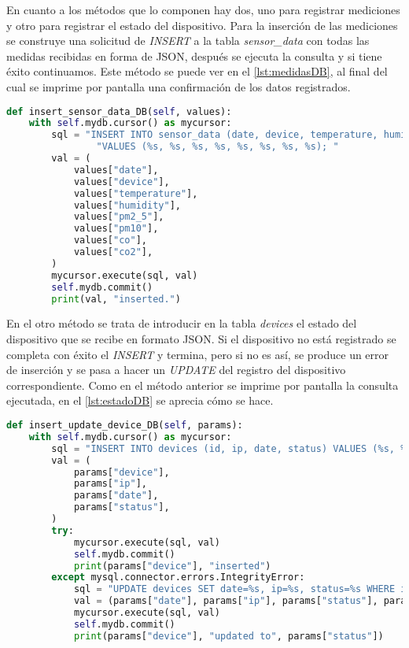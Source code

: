 En cuanto a los métodos que lo componen hay dos, uno para registrar mediciones y otro para registrar el estado del dispositivo. Para la inserción de las mediciones se construye una solicitud de \textit{INSERT} a la tabla \textit{sensor\_data} con todas las medidas recibidas en forma de JSON, después se ejecuta la consulta y si tiene éxito continuamos. Este método se puede ver en el \autoref{lst:medidasDB}, al final del cual se imprime por pantalla una confirmación de los datos registrados.
\begin{lstlisting}[language=Python, label=lst:medidasDB, caption=Inserción de mediciones en la base de datos]
def insert_sensor_data_DB(self, values):
    with self.mydb.cursor() as mycursor:
        sql = "INSERT INTO sensor_data (date, device, temperature, humidity, pm2_5, pm10, co, co2)" \
                "VALUES (%s, %s, %s, %s, %s, %s, %s, %s); "
        val = (
            values["date"],
            values["device"],
            values["temperature"],
            values["humidity"],
            values["pm2_5"],
            values["pm10"],
            values["co"],
            values["co2"],
        )
        mycursor.execute(sql, val)
        self.mydb.commit()
        print(val, "inserted.")
\end{lstlisting}

En el otro método se trata de introducir en la tabla \textit{devices} el estado del dispositivo que se recibe en formato JSON. Si el dispositivo no está registrado se completa con éxito el \textit{INSERT} y termina, pero si no es así, se produce un error de inserción y se pasa a hacer un \textit{UPDATE} del registro del dispositivo correspondiente. Como en el método anterior se imprime por pantalla la consulta ejecutada, en el \autoref{lst:estadoDB} se aprecia cómo se hace.
\begin{lstlisting}[language=Python, label=lst:estadoDB, caption=Inserción de estado del dispositivo en la base de datos]
def insert_update_device_DB(self, params):
    with self.mydb.cursor() as mycursor:
        sql = "INSERT INTO devices (id, ip, date, status) VALUES (%s, %s, %s, %s)"
        val = (
            params["device"],
            params["ip"],
            params["date"],
            params["status"],
        )
        try:
            mycursor.execute(sql, val)
            self.mydb.commit()
            print(params["device"], "inserted")
        except mysql.connector.errors.IntegrityError:
            sql = "UPDATE devices SET date=%s, ip=%s, status=%s WHERE id=%s"
            val = (params["date"], params["ip"], params["status"], params["device"])
            mycursor.execute(sql, val)
            self.mydb.commit()
            print(params["device"], "updated to", params["status"])
\end{lstlisting}

